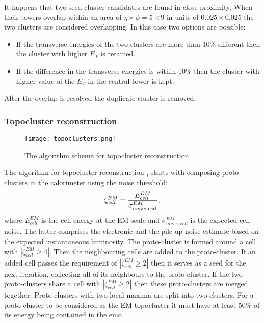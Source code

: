      It happens that two seed-cluster candidates are found in close proximity. When their towers overlap within an area of $\eta \times \phi=5\times 9$ in units of $0.025\times0.025$ the two clusters are considered overlapping. In this case two options are possible:
      \begin{itemize}
     	\item If the transverse energies of the two clusters are more than 10\% different then the cluster with higher $E_T$ is retained.
     	\item If the difference in the transverse energies is within 10\% then the cluster with higher value of the $E_T$ in the central tower is kept.
     \end{itemize}
 	After the overlap is resolved the duplicate cluster is removed.\\
 	 \subsubsection{Topocluster reconstruction}
 	  	 	\label{sec::topocluster}
 	  	\begin{figure}[htbp]
 	 	\centering
 	 	\texttt{[image: topoclusters.png]}
 	 	\caption[Topocluster reconstruction]{The algorithm scheme for topocluster reconstruction.}
 	 	\label{fig::topocluster}
 	 \end{figure}
 	 The algorithm for topocluster reconstruction \cite{topoclust2_2016}, \cite{topoclust_2019} starts with composing proto-clusters in the calorimeter using the noise threshold:
 	 \begin{equation}
 	 	\zeta_{cell}^{EM} =\frac{E_{cell}^{EM}}{\sigma_{noise,cell}^{EM}},\\
 	 \end{equation}
 	 where $E_{cell}^{EM}$ is the cell energy at the EM scale and $\sigma_{noise,cell}^{EM}$ is the expected cell noise. The latter comprises the electronic and the pile-up noise estimate based on the expected instantaneous luminosity. The proto-cluster is formed around a cell with $|\zeta_{cell}^{EM} \ge 4|$. Then the neighbouring cells are added to the proto-cluster. If an added cell passes the requirement of $|\zeta_{cell}^{EM} \ge 2 |$ then it serves as a seed for the next iteration, collecting all of its neighbours to the proto-cluster. If the two proto-clusters share a cell with $|\zeta_{cell}^{EM} \ge 2|$ then these proto-clusters are merged together. Proto-clusters with two local maxima are split into two clusters. For a proto-cluster to be considered as the EM topocluster it must have at least 50\% of its energy being contained in the \gls{emc}.
